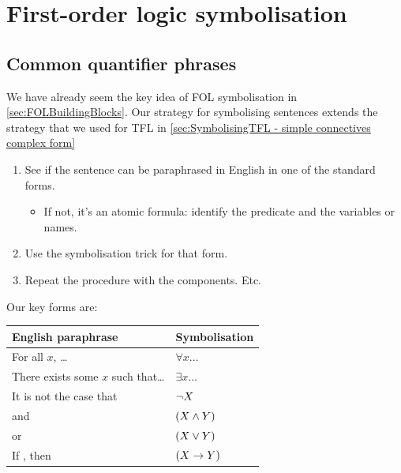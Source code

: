 \part{First-order logic symbolisation}
\label{ch:FOL}


	\chapter{Common quantifier phrases}
	\label{sec:SymbolisingComplexFOL}
	We have already seem the key idea of FOL symbolisation in \cref{sec:FOLBuildingBlocks}. Our strategy for symbolising sentences extends the strategy that we used for TFL in \cref{sec:SymbolisingTFL - simple connectives complex form}
	
	\begin{highlighted}
		\begin{enumerate}
			\item See if the sentence can be paraphrased in English in one of the standard forms.
			\begin{itemize}
				\item If not, it's an atomic formula: identify the predicate and the variables or names.
			\end{itemize}
			\item Use the symbolisation trick for that form.
			\item Repeat the procedure with the components. Etc.
		\end{enumerate}
	\end{highlighted}
	
	Our key forms are:
	
	\begin{highlighted}
		\begin{center}
			\begin{tabular}{ll}
				\textbf{English paraphrase}&\textbf{Symbolisation}\\
				\hline
				For all $x$, \ldots &$\forall x \ldots$\\
				There exists some $x$ such that\ldots &$\exists x \ldots$\\
				It is not the case that \metaX&$\neg X$\\
				\metaX and \metaY&$(X\mathbin{\wedge}Y)$\\
				\metaX or \metaY&$(X\vee Y)$\\
				If \metaX, then \metaY&$(X\rightarrow Y)$\\
			\end{tabular}
		\end{center}
	\end{highlighted}
	
